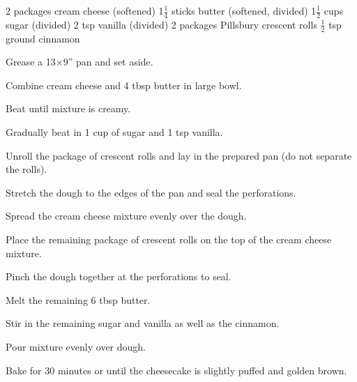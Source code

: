 \dishtype{\dessert}
\dishother{\vegetarian}
\begin{ingreds}
    2 packages cream cheese (softened)
    1$\frac{1}{4}$ sticks butter (softened, divided)
    1$\frac{1}{2}$ cups sugar (divided)
    2 tsp vanilla (divided)
    2 packages Pillsbury\textsuperscript{\textregistered} crescent rolls 
    $\frac{1}{2}$ tsp ground cinnamon
\end{ingreds}
\begin{method}
    Grease a 13$\times$9'' pan and set aside.\par
    Combine cream cheese and 4 tbsp butter in large bowl.\par
    Beat until mixture is creamy.\par
    Gradually beat in 1 cup of sugar and 1 tsp vanilla.\par
    Unroll the package of crescent rolls and lay in the prepared pan (do not separate the rolls).\par
    Stretch the dough to the edges of the pan and seal the perforations.\par
    Spread the cream cheese mixture evenly over the dough.\par
    Place the remaining package of crescent rolls on the top of the cream cheese mixture.\par
    Pinch the dough together at the perforations to seal.\par
    Melt the remaining 6 tbsp butter.\par
    Stir in the remaining sugar and vanilla as well as the cinnamon.\par
    Pour mixture evenly over dough.\par
    Bake for 30 minutes or until the cheesecake is slightly puffed and golden brown.
\end{method}